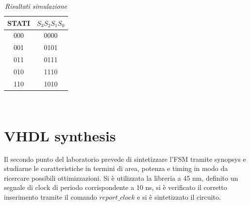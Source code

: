 \begin{table}[!h]\footnotesize
	\centering
	\begin{tabular}{|c|c|}
		\hline
		\textbf{STATI} & \textbf{$S_{3}S_{2}S_{1}S_{0}$}\\
		\hline
		000 & 0000\\
		\hline
		001 &0101 \\
		\hline
		011& 0111\\
		\hline
		010& 1110\\
		\hline
		110& 1010\\
		\hline 
	\end{tabular}
	\caption{\textit{Risultati simulazione}}
	\label{tab2}
\end{table} \\
\section{VHDL synthesis}
Il secondo punto del laboratorio prevede di sintetizzare l’FSM tramite synopsys e studiarne le caratteristiche in termini di area, potenza e timing in modo da ricercare possibili ottimizzazioni. Si è utilizzata la libreria a 45 nm, definito un segnale di clock di periodo corrispondente a 10 ns, si è verificato il corretto inserimento tramite il comando \emph{$report\_clock$} e si è sintetizzato il circuito.\\

